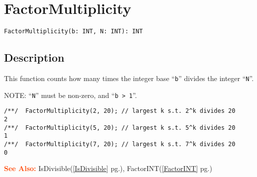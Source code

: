 \documentclass[a4paper]{mybook}
\newenvironment{command}{}{} %
\newcommand\SeeAlso{\par\textcolor{OrangeRed}{\textbf{\large See Also: }}}
\begin{document}
\section{FactorMultiplicity}
\label{FactorMultiplicity}
\begin{command} %


\begin{Verbatim}[label=syntax, rulecolor=\color{MidnightBlue},
frame=single]
FactorMultiplicity(b: INT, N: INT): INT
\end{Verbatim}


\subsection*{Description}

This function counts how many times the integer base ``\verb&b&'' 
divides the integer ``\verb&N&''.
\par 
NOTE: ``\verb&N&'' must be non-zero, and ``\verb&b > 1&''.
\begin{Verbatim}[label=example, rulecolor=\color{PineGreen}, frame=single]
/**/  FactorMultiplicity(2, 20); // largest k s.t. 2^k divides 20
2
/**/  FactorMultiplicity(5, 20); // largest k s.t. 5^k divides 20
1
/**/  FactorMultiplicity(7, 20); // largest k s.t. 7^k divides 20
0
\end{Verbatim}


\SeeAlso %
  IsDivisible(\ref{IsDivisible} pg.\pageref{IsDivisible}), 
    FactorINT(\ref{FactorINT} pg.\pageref{FactorINT})
\end{command} %
\end{document}
